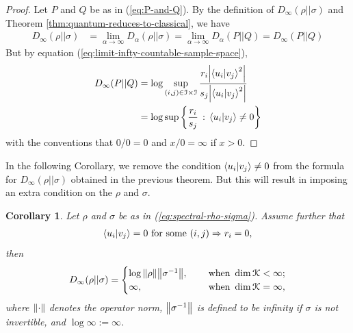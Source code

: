 \documentclass[12pt,a4paper,oneside]{article}
\numberwithin{equation}{section}
\theoremstyle{definition}  %
\theoremstyle{plain}  %
\newtheorem{cor}[defn]{Corollary}
\theoremstyle{remark} %
\newcommand{\CK}{\mathcal{K}}
\begin{document}
 \begin{proof} Let $P$ and $Q$ be as in (\ref{eq:P-and-Q}).
By the definition  of $D_{\infty}(\rho||\sigma)$ and Theorem \ref{thm:quantum-reduces-to-classical}, we have 
\begin{align*}
 D_{\infty}(\rho||\sigma)&= \lim_{\alpha\rightarrow \infty}D_{\alpha}(\rho||\sigma)= \lim_{\alpha\rightarrow \infty}D_{\alpha}(P||Q) = D_{\infty}(P||Q)
\end{align*}
But by equation (\ref{eq:limit-infty-countable-sample-space}), \begin{align*}
  D_{\infty}(P||Q) &= \log \underset{(i,j)\in \mathcal{I}\times \mathcal{I}}{\sup}\,\frac{r_i \abs{\braket{u_i}{v_j}^2}}{s_j\abs{\braket{u_i}{v_j}^2}}\\
  &=\log \underset{}{\sup}\left\{\frac{r_i}{s_j}\,:\,\braket{u_i}{v_j}\neq 0\right\}
\end{align*}
with the conventions that $0/0 = 0$ and $x/0 = \infty$ if $x>0$.
 \end{proof}
 In the following Corollary, we remove the condition $\braket{u_i}{v_j}\neq 0$ from the formula for $D_{\infty}(\rho||\sigma)$ obtained in the previous theorem. But this will result in imposing an extra condition on the $\rho$ and $\sigma$.
 \begin{cor}\label{cor:d-infty}
 Let $\rho$ and $\sigma$ be as in (\ref{eq:spectral-rho-sigma}). Assume further that \begin{align}\label{eq:D-infty-hypothesis}
     \braket{u_i}{v_j}=0 \text{ for some } (i,j) \Rightarrow r_i = 0,
 \end{align}
 then 
 \begin{align}
     D_{\infty}(\rho||\sigma)  =\begin{cases}
       \log \norm{\rho}\norm{\sigma^{-1}}, \quad &\text{ when } \dim \CK<\infty;\\
       \infty,\quad &\text{ when } \dim \CK=\infty,
       \end{cases}
 \end{align}
where $\norm{\cdot}$ denotes the operator norm,   $\norm{\sigma^{-1}}$ is defined to be infinity if $\sigma$ is not invertible, and $\log \infty:=\infty$.
 \end{cor}
\end{document}
